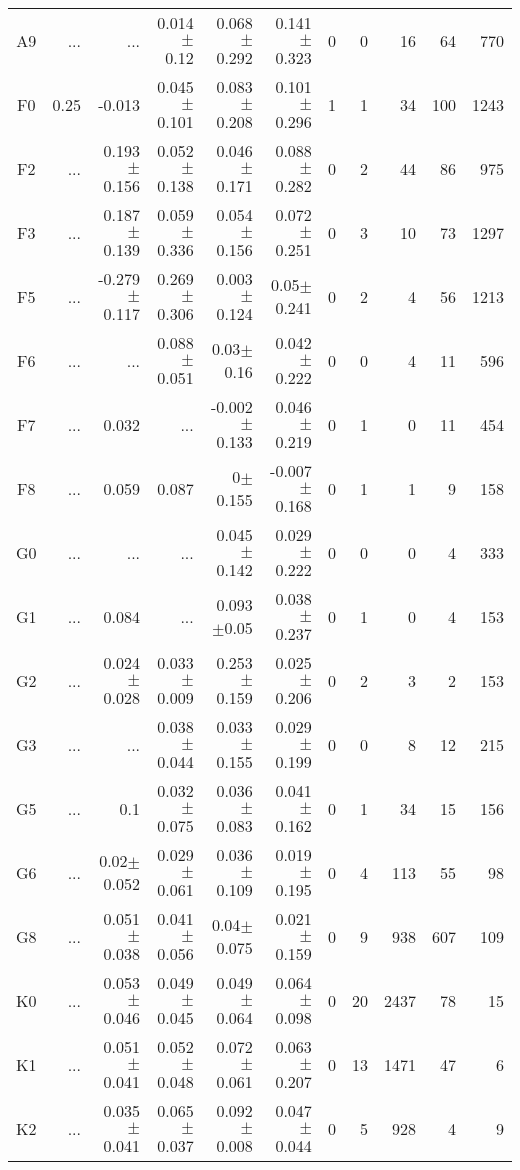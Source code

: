 \begin{table}[t]
\begin{table}[t]
\begin{center}
\begin{tabular}{c|rrrrr|rrrrr}
    A9	&	 ...	&	 ...	&	0.014$\pm$0.12	&	0.068$\pm$0.292	&	0.141$\pm$0.323	&	0	&	0	&	16	&	64	&	770	\\
    F0	&	0.25	&	-0.013	&	0.045$\pm$0.101	&	0.083$\pm$0.208	&	0.101$\pm$0.296	&	1	&	1	&	34	&	100	&	1243	\\
    F2	&	 ...	&	0.193$\pm$0.156	&	0.052$\pm$0.138	&	0.046$\pm$0.171	&	0.088$\pm$0.282	&	0	&	2	&	44	&	86	&	975	\\
    F3	&	 ...	&	0.187$\pm$0.139	&	0.059$\pm$0.336	&	0.054$\pm$0.156	&	0.072$\pm$0.251	&	0	&	3	&	10	&	73	&	1297	\\
    F5	&	 ...	&	-0.279$\pm$0.117	&	0.269$\pm$0.306	&	0.003$\pm$0.124	&	0.05$\pm$0.241	&	0	&	2	&	4	&	56	&	1213	\\
    F6	&	 ...	&	 ...	&	0.088$\pm$0.051	&	0.03$\pm$0.16	&	0.042$\pm$0.222	&	0	&	0	&	4	&	11	&	596	\\
    F7	&	 ...	&	0.032	&	 ...	&	-0.002$\pm$0.133	&	0.046$\pm$0.219	&	0	&	1	&	0	&	11	&	454	\\
    F8	&	 ...	&	0.059	&	0.087	&	0$\pm$0.155	&	-0.007$\pm$0.168	&	0	&	1	&	1	&	9	&	158	\\
    G0	&	 ...	&	 ...	&	 ...	&	0.045$\pm$0.142	&	0.029$\pm$0.222	&	0	&	0	&	0	&	4	&	333	\\
    G1	&	 ...	&	0.084	&	 ...	&	0.093$\pm$0.05	&	0.038$\pm$0.237	&	0	&	1	&	0	&	4	&	153	\\
    G2	&	 ...	&	0.024$\pm$0.028	&	0.033$\pm$0.009	&	0.253$\pm$0.159	&	0.025$\pm$0.206	&	0	&	2	&	3	&	2	&	153	\\
    G3	&	 ...	&	 ...	&	0.038$\pm$0.044	&	0.033$\pm$0.155	&	0.029$\pm$0.199	&	0	&	0	&	8	&	12	&	215	\\
    G5	&	 ...	&	0.1	&	0.032$\pm$0.075	&	0.036$\pm$0.083	&	0.041$\pm$0.162	&	0	&	1	&	34	&	15	&	156	\\
    G6	&	 ...	&	0.02$\pm$0.052	&	0.029$\pm$0.061	&	0.036$\pm$0.109	&	0.019$\pm$0.195	&	0	&	4	&	113	&	55	&	98	\\
    G8	&	 ...	&	0.051$\pm$0.038	&	0.041$\pm$0.056	&	0.04$\pm$0.075	&	0.021$\pm$0.159	&	0	&	9	&	938	&	607	&	109	\\
    K0	&	 ...	&	0.053$\pm$0.046	&	0.049$\pm$0.045	&	0.049$\pm$0.064	&	0.064$\pm$0.098	&	0	&	20	&	2437	&	78	&	15	\\
    K1	&	 ...	&	0.051$\pm$0.041	&	0.052$\pm$0.048	&	0.072$\pm$0.061	&	0.063$\pm$0.207	&	0	&	13	&	1471	&	47	&	6	\\
    K2	&	 ...	&	0.035$\pm$0.041	&	0.065$\pm$0.037	&	0.092$\pm$0.008	&	0.047$\pm$0.044	&	0	&	5	&	928	&	4	&	9	\\

\end{tabular}
\end{center}
\end{table}
\end{table}
